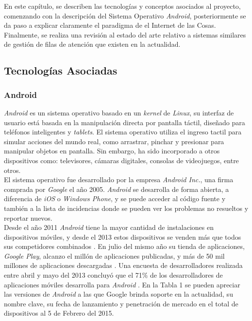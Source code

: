 En este capítulo, se describen las tecnologías y conceptos asociados al proyecto, comenzando con la descripción del Sistema Operativo \textit{Android}, posteriormente se da paso a explicar claramente el paradigma de el Internet de las Cosas. Finalmente, se realiza una revisión al estado del arte relativo a sistemas similares de gestión de filas de atención que existen en la actualidad.\\

\subsection{Tecnologías Asociadas}
\subsubsection{Android}

\textit{Android} es un sistema operativo basado en un \textit{kernel} de \textit{Linux}, su interfaz de usuario está basada en la manipulación directa por pantalla táctil, diseñado para teléfonos inteligentes y \textit{tablets}. El sistema operativo utiliza el ingreso tactil para simular acciones del mundo real, como arrastrar, pinchar y presionar para manipular objetos en pantalla. Sin embargo, ha sido incorporado a otros dispositivos como: televisores, cámaras digitales, consolas de videojuegos, entre otros.\\

El sistema operativo fue desarrollado por la empresa \textit{Android Inc.}, una firma comprada por \textit{Google} el año 2005. \textit{Android} se desarrolla de forma abierta, a diferencia de \textit{iOS} o \textit{Windows Phone}, y se puede acceder al código fuente y también a la lista de incidencias donde se pueden ver los problemas no resueltos y reportar nuevos.\\

Desde el año 2011 \textit{Android} tiene la mayor cantidad de instalaciones en dispositivos móviles, y desde el 2013 estos dispositivos se venden más que todos sus competidores combinados \cite{Bus14}. En julio del mismo año su tienda de aplicaciones, \textit{Google Play}, alcanzo el millón de aplicaciones publicadas, y más de 50 mil millones de aplicaciones descargadas \cite{Pho13}. Una encuesta de desarrolladores realizada entre abril y mayo del 2013 concluyó que el 71\% de los desarrolladores de aplicaciones móviles desarrolla para \textit{Android} \cite{Dev13}. En la Tabla 1 se pueden apreciar las versiones de \textit{Android} a las que Google brinda soporte en la actualidad, su nombre clave, su fecha de lanzamiento y penetración de mercado en el total de dispositivos al 5 de Febrero del 2015.\\


